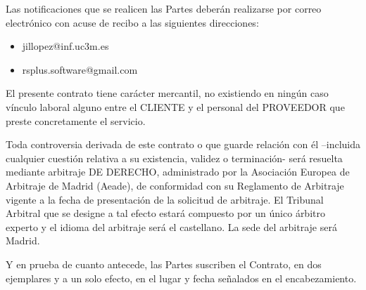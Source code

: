 \begin{description}[style=nextline]
\item[NOVENA.- NOTIFICACIONES]
	\par Las notificaciones que se realicen las Partes deberán realizarse por correo electrónico con acuse de recibo a las siguientes direcciones:
  \begin{itemize}[-]
    \item jillopez@inf.uc3m.es
    \item rsplus.software@gmail.com
  \end{itemize}

\item[DÉCIMA.- REGIMEN JURÍDICO]
\par El presente contrato tiene carácter mercantil, no existiendo en ningún caso vínculo laboral alguno entre el CLIENTE  y el personal del PROVEEDOR que preste concretamente el servicio.
\par Toda controversia derivada de este contrato o que guarde relación con él –incluida cualquier cuestión relativa a su existencia, validez o terminación- será resuelta mediante arbitraje DE DERECHO, administrado por la Asociación Europea de Arbitraje de Madrid (Aeade), de conformidad con su Reglamento de Arbitraje vigente a la fecha de presentación de la solicitud de arbitraje. El Tribunal Arbitral que se designe a tal efecto estará compuesto por un único árbitro experto y el idioma del arbitraje será el castellano. La sede del arbitraje será Madrid.

\end{description}
\par Y en prueba de cuanto antecede, las Partes suscriben el Contrato, en dos ejemplares y a un solo efecto, en el lugar y fecha señalados en el encabezamiento.
